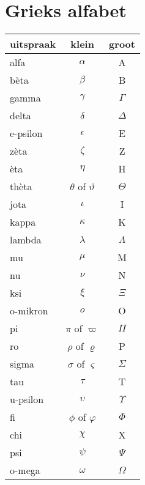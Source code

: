 \documentclass[12pt,twoside,a4paper]{article}
\begin{document}
\pagebreak
\appendix

\section{Grieks alfabet}

\begin{center}
  \begin{tabular}{lcc}
    \hline
    \bf uitspraak & \bf klein & \bf groot \\
    \hline
    alfa & $\alpha$ & A\\
    b\`eta & $\beta$ & B\\
    gamma & $\gamma$ & $\Gamma$ \\
    delta & $\delta$ & $\Delta$ \\
    e-psilon & $\epsilon$ & E\\
    z\`eta & $\zeta$ & Z\\
    \`eta & $\eta$ & H\\
    th\`eta & $\theta$ of $\vartheta$ & $\Theta$\\
    jota & $\iota$ & I\\
    kappa & $\kappa$ & K\\
    lambda & $\lambda$ & $\Lambda$\\
    mu & $\mu$ & M\\
    nu & $\nu$ & N\\
    ksi & $\xi$ & $\Xi$\\
    o-mikron & $o$ & O\\
    pi & $\pi$ of $\varpi$ & $\Pi$\\
    ro & $\rho$ of $\varrho$ & P\\
    sigma & $\sigma$ of $\varsigma$ & $\Sigma$\\
    tau & $\tau$ & T\\
    u-psilon & $\upsilon$ & $\Upsilon$\\
    fi & $\phi$ of $\varphi$ & $\Phi$\\
    chi & $\chi$ & X\\
    psi & $\psi$ & $\Psi$\\
    o-mega & $\omega$ & $\Omega$\\
    \hline
  \end{tabular}
\end{center}
\end{document}
